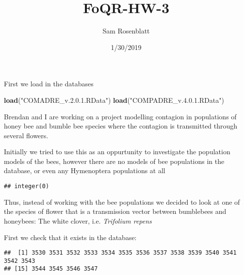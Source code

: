 \documentclass[]{article}
\title{FoQR-HW-3}
\author{Sam Rosenblatt}
\date{1/30/2019}
\newenvironment{Shaded}{\begin{snugshade}}{\end{snugshade}}
\newcommand{\KeywordTok}[1]{\textcolor[rgb]{0.13,0.29,0.53}{\textbf{#1}}}
\newcommand{\DataTypeTok}[1]{\textcolor[rgb]{0.13,0.29,0.53}{#1}}
\newcommand{\StringTok}[1]{\textcolor[rgb]{0.31,0.60,0.02}{#1}}
\newcommand{\OperatorTok}[1]{\textcolor[rgb]{0.81,0.36,0.00}{\textbf{#1}}}
\newcommand{\NormalTok}[1]{#1}
\begin{document}
\maketitle

First we load in the databases

\begin{Shaded}
\begin{Highlighting}[]
\KeywordTok{load}\NormalTok{(}\StringTok{"COMADRE_v.2.0.1.RData"}\NormalTok{)}
\KeywordTok{load}\NormalTok{(}\StringTok{"COMPADRE_v.4.0.1.RData"}\NormalTok{)}
\end{Highlighting}
\end{Shaded}

Brendan and I are working on a project modelling contagion in
populations of honey bee and bumble bee species where the contagion is
transmitted through several flowers.

Initially we tried to use this as an oppurtunity to investigate the
population models of the bees, however there are no models of bee
populations in the database, or even any Hymenoptera populations at all

\begin{Shaded}
\end{Shaded}

\begin{verbatim}
## integer(0)
\end{verbatim}

Thus, instead of working with the bee populations we decided to look at
one of the species of flower that is a transmission vector between
bumblebees and honeybees: The white clover, i.e. \emph{Trifolium repens}

First we check that it exists in the database:

\begin{Shaded}
\end{Shaded}

\begin{verbatim}
##  [1] 3530 3531 3532 3533 3534 3535 3536 3537 3538 3539 3540 3541 3542 3543
## [15] 3544 3545 3546 3547
\end{verbatim}
\end{document}
